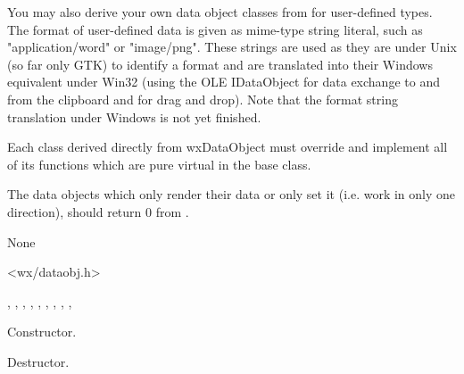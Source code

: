 You may also derive your own data object classes from 
 for user-defined types. The
format of user-defined data is given as mime-type string literal, such as
"application/word" or "image/png". These strings are used as they are under
Unix (so far only GTK) to identify a format and are translated into their
Windows equivalent under Win32 (using the OLE IDataObject for data exchange to
and from the clipboard and for drag and drop). Note that the format string
translation under Windows is not yet finished.



Each class derived directly from wxDataObject must override and implement all
of its functions which are pure virtual in the base class.

The data objects which only render their data or only set it (i.e. work in
only one direction), should return 0 from 
.


None


<wx/dataobj.h>


, 
, 
, 
, 
, 
, 
, 
, 
, 


\label{wxdataobjectwxdataobject}


Constructor.

\label{wxdataobjectdtor}


Destructor.

